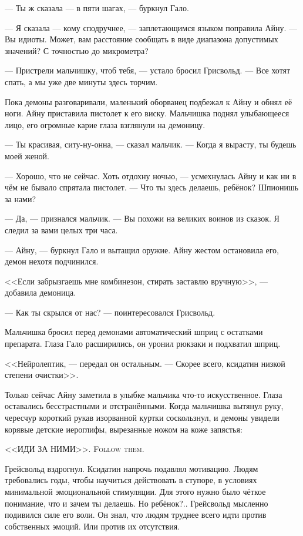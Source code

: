 --- Ты ж сказала --- в пяти шагах, --- буркнул Гало.

--- Я сказала --- кому сподручнее, --- заплетающимся языком поправила Айну.
--- Вы идиоты.
Может, вам расстояние сообщать в виде диапазона допустимых значений?
С точностью до микрометра?

--- Пристрели мальчишку, чтоб тебя, --- устало бросил Грисвольд.
--- Все хотят спать, а мы уже две минуты здесь торчим.

Пока демоны разговаривали, маленький оборванец подбежал к Айну и обнял её ноги.
Айну приставила пистолет к его виску.
Мальчишка поднял улыбающееся лицо, его огромные карие глаза взглянули на демоницу.

--- Ты красивая, ситу-ну-онна\FM, --- сказал мальчик.
--- Когда я вырасту, ты будешь моей женой.

--- Хорошо, что не сейчас.
Хоть отдохну ночью, --- усмехнулась Айну и как ни в чём не бывало спрятала пистолет.
--- Что ты здесь делаешь, ребёнок?
Шпионишь за нами?

--- Да, --- признался мальчик.
--- Вы похожи на великих воинов из сказок.
Я следил за вами целых три часа.

--- Айну, --- буркнул Гало и вытащил оружие.
Айну жестом остановила его, демон нехотя подчинился.

<<Если забрызгаешь мне комбинезон, стирать заставлю вручную>>, --- добавила демоница.

--- Как ты скрылся от нас? --- поинтересовался Грисвольд.

Мальчишка бросил перед демонами автоматический шприц с остатками препарата.
Глаза Гало расширились, он уронил рюкзаки и подхватил шприц.

<<Нейролептик, --- передал он остальным.
--- Скорее всего, ксидатин низкой степени очистки>>.

Только сейчас Айну заметила в улыбке мальчика что-то искусственное.
Глаза оставались бесстрастными и отстранёнными.
Когда мальчишка вытянул руку, чересчур короткий рукав изорванной куртки соскользнул, и демоны увидели корявые детские иероглифы, вырезанные ножом на коже запястья:

{<<ИДИ ЗА НИМИ>>.}
{\textsc{Follow them.}}

Грейсвольд вздрогнул.
Ксидатин напрочь подавлял мотивацию.
Людям требовались годы, чтобы научиться действовать в ступоре, в условиях минимальной эмоциональной стимуляции.
Для этого нужно было чёткое понимание, что и зачем ты делаешь.
Но ребёнок?..
Грейсвольд мысленно подивился силе его воли.
Он знал, что людям труднее всего идти против собственных эмоций.
Или против их отсутствия.

